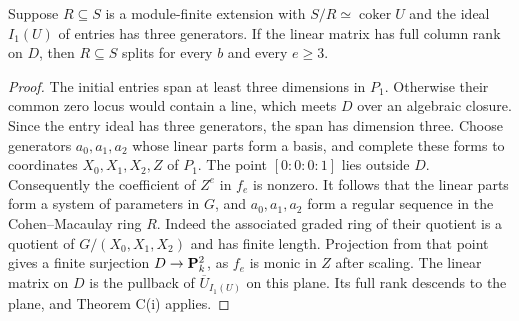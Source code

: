 \begin{corollary}\label{three-entries}
Suppose $R\subseteq S$ is a module-finite extension with $S/R\simeq\operatorname{coker}U$ and the ideal $I_1(U)$ of entries has three generators. If the linear matrix has full column rank on $D$, then $R\subseteq S$ splits for every $b$ and every $e\ge3$.
\end{corollary}
\begin{proof}
The initial entries span at least three dimensions in $P_1$. Otherwise their common zero locus would contain a line, which meets $D$ over an algebraic closure. Since the entry ideal has three generators, the span has dimension three. Choose generators $a_0,a_1,a_2$ whose linear parts form a basis, and complete these forms to coordinates $X_0,X_1,X_2,Z$ of $P_1$. The point $[0:0:0:1]$ lies outside $D$. Consequently the coefficient of $Z^e$ in $f_e$ is nonzero. It follows that the linear parts form a system of parameters in $G$, and $a_0,a_1,a_2$ form a regular sequence in the Cohen--Macaulay ring $R$. Indeed the associated graded ring of their quotient is a quotient of $G/(X_0,X_1,X_2)$ and has finite length.
Projection from that point gives a finite surjection $D\to\mathbf P^2_k$, as $f_e$ is monic in $Z$ after scaling. The linear matrix on $D$ is the pullback of $\overline U_{I_1(U)}$ on this plane. Its full rank descends to the plane, and Theorem C(i) applies.
\end{proof}


